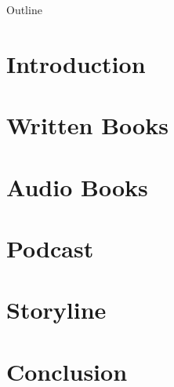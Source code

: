 \documentclass[
    NAME={Dr. Helga Ingimundardóttir},
    EMAIL={helgaingim@hi.is},
    FACULTY={Industrial Engineering},
    TITLE={Pushing Boundaries: A Data-Driven Dive into `Legend of the Ice People'},
    SUBTITLE={Unravel the unexpected synergy of literature and data science},
    SEMINAR={Haustráðstefna Advania},
    DATE={September 8, 2023}
    ]{hi-latex/hi-beamer}
\begin{document}
\begin{frame}{Outline}
  \tableofcontents
\end{frame}

\section{Introduction}


\section{Written Books}


\section{Audio Books}


\section{Podcast}


\section{Storyline}


\section{Conclusion}

\end{document}
